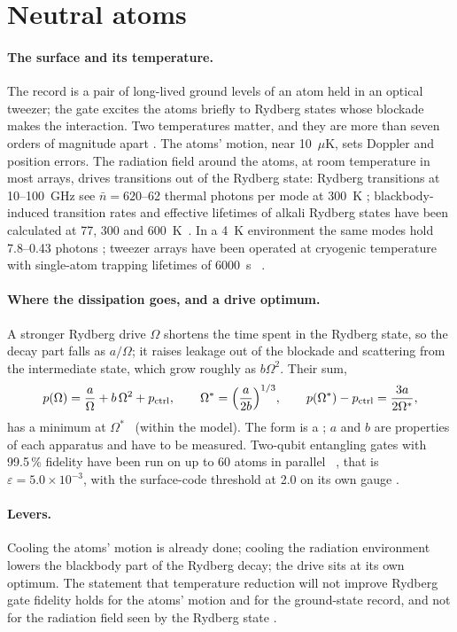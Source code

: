 \section{Neutral atoms}\label{sec:qp_atoms}
\paragraph{The surface and its temperature.} The record is a pair of long-lived ground levels of an atom held in an optical tweezer; the
gate excites the atoms briefly to Rydberg states whose blockade makes the interaction. Two temperatures matter, and they are more than seven orders of
magnitude apart \interp. The atoms' motion, near 10~$\mu$K, sets Doppler and position errors. The radiation field around the atoms, at
room temperature in most arrays, drives transitions out of the Rydberg state: Rydberg transitions at 10--100~GHz see $\bar n=620$--62
thermal photons per mode at 300~K \calc; blackbody-induced transition rates and effective lifetimes of alkali Rydberg states have been calculated
at 77, 300 and 600~K~\cite{Beterov2009}. In a 4~K environment the same modes hold 7.8--0.43 photons \calc; tweezer arrays have been operated at cryogenic temperature
with single-atom trapping lifetimes of 6000~s~\cite{Schymik2021} \observed.

\paragraph{Where the dissipation goes, and a drive optimum.} A stronger Rydberg drive $\Omega$ shortens the time spent in the Rydberg state,
so the decay part falls as $a/\Omega$; it raises leakage out of the blockade and scattering from the intermediate state, which grow roughly
as $b\Omega^2$. Their sum,
\begin{equation}
 p(\Omega)=\frac{a}{\Omega}+b\,\Omega^2+p_{\rm ctrl},\qquad \Omega^*=\Bigl(\frac{a}{2b}\Bigr)^{1/3},\qquad p(\Omega^*)-p_{\rm ctrl}=\frac{3a}{2\Omega^*},
 \label{eq:qp_rydberg}
\end{equation}
has a minimum at $\Omega^*$ \derived\ (within the model). The form is a \conjecture; $a$ and
$b$ are properties of each apparatus and have to be measured. Two-qubit entangling gates with 99.5\,\% fidelity have been run on up to 60
atoms in parallel~\cite{Evered2023} \observed, that is $\varepsilon=5.0\times10^{-3}$, with the surface-code threshold at 2.0 on its own
gauge \calc.

\paragraph{Levers.} Cooling the atoms' motion is already done; cooling the radiation environment lowers the blackbody part of the Rydberg
decay; the drive sits at its own optimum. The statement that temperature reduction will not improve Rydberg gate fidelity holds for the
atoms' motion and for the ground-state record, and not for the radiation field seen by the Rydberg state \interp.

